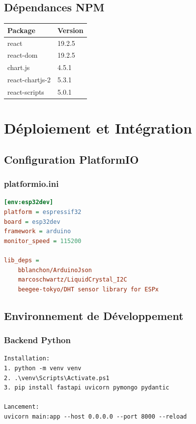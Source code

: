 \documentclass[12pt,french]{report}
\begin{document}
\section{Dépendances NPM}

\begin{table}[h]
\centering
\begin{tabular}{|l|l|}
\hline
\textbf{Package} & \textbf{Version} \\
\hline
react & 19.2.5 \\
react-dom & 19.2.5 \\
chart.js & 4.5.1 \\
react-chartjs-2 & 5.3.1 \\
react-scripts & 5.0.1 \\
\hline
\end{tabular}
\end{table}

\chapter{Déploiement et Intégration}

\section{Configuration PlatformIO}

\subsection{platformio.ini}

\begin{lstlisting}[language=ini]
[env:esp32dev]
platform = espressif32
board = esp32dev
framework = arduino
monitor_speed = 115200

lib_deps = 
    bblanchon/ArduinoJson
    marcoschwartz/LiquidCrystal_I2C
    beegee-tokyo/DHT sensor library for ESPx
\end{lstlisting}

\section{Environnement de Développement}

\subsection{Backend Python}

\begin{verbatim}
Installation:
1. python -m venv venv
2. .\venv\Scripts\Activate.ps1
3. pip install fastapi uvicorn pymongo pydantic

Lancement:
uvicorn main:app --host 0.0.0.0 --port 8000 --reload
\end{verbatim}
\end{document}
